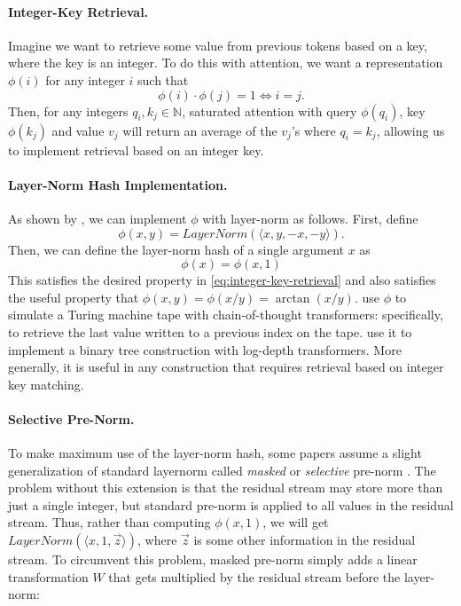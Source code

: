 \paragraph{Integer-Key Retrieval.}
Imagine we want to retrieve some value from previous tokens based on a key, where the key is an integer.
To do this with attention, we want a representation $\phi(i)$ for any integer $i$ such that
\begin{equation} \label{eq:integer-key-retrieval}
    \phi(i) \cdot \phi(j) = 1 \iff i = j .
\end{equation}
Then, for any integers $q_i, k_j \in \mathbb N$, saturated attention with query $\phi(q_i)$, key $\phi(k_j)$ and value $v_j$ will return an average of the $v_j$'s where $q_i = k_j$, allowing us to implement retrieval based on an integer key.

\paragraph{Layer-Norm Hash Implementation.}
As shown by \citet{merrill-sabharwal-2024-cot}, we can implement $\phi$ with layer-norm as follows. First, define
\begin{equation*}
    \phi(x, y) = LayerNorm(\langle x, y, -x, -y \rangle) .
\end{equation*}
Then, we can define the layer-norm hash of a single argument $x$ as
\begin{equation*}
    \phi(x) = \phi(x, 1)
\end{equation*}
This satisfies the desired property in \eqref{eq:integer-key-retrieval} and also satisfies the useful property that $\phi(x, y) = \phi(x/y) = \arctan(x/y)$.
\citet{merrill-sabharwal-2024-cot} use $\phi$ to simulate a Turing machine tape with chain-of-thought transformers: specifically, to retrieve the last value written to a previous index on the tape.
\citet{merrill2024little} use it to implement a binary tree construction with log-depth transformers.
More generally, it is useful in any construction that requires retrieval based on integer key matching.

\paragraph{Selective Pre-Norm.}
To make maximum use of the layer-norm hash, some papers assume a slight generalization of standard layernorm called \emph{masked} or \emph{selective} pre-norm \citep{merrill-sabharwal-2024-cot,merrill2024little}.
The problem without this extension is that the residual stream may store more than just a single integer, but standard pre-norm is applied to all values in the residual stream. Thus, rather than computing $\phi(x, 1)$, we will get $LayerNorm(\langle x, 1, \vec z \rangle)$, where $\vec z$ is some other information in the residual stream.
To circumvent this problem, masked pre-norm simply adds a linear transformation $W$ that gets multiplied by the residual stream before the layer-norm:


